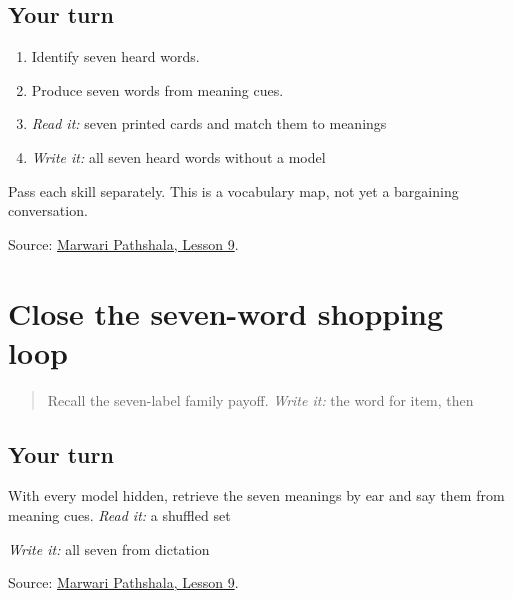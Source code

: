 \subsection*{Your turn}
\begin{enumerate}
\raggedright
  \item Identify seven heard words.
  \item Produce seven words from meaning cues.
  \item \emph{Read it:} seven printed cards and match them to meanings
  \item \emph{Write it:} all seven heard words without a model
\end{enumerate}

Pass each skill separately. This is a vocabulary map, not yet a bargaining conversation.

\begin{tcolorbox}[breakable,colback=teal!4,colframe=teal!35!black,title={Before you move on}]
Source: \href{https://www.marwaripathshala.com/marwari-lesson-9-english}{Marwari Pathshala, Lesson 9}.
\end{tcolorbox}
\section[Practice]{Close the seven-word shopping loop}

\label{lesson:MW-R15-shopping-close}



\begin{quote}
Recall the seven-label family payoff. \emph{Write it:} the word for item, then \textbf{}
\end{quote}

\subsection*{Your turn}
With every model hidden, retrieve the seven meanings by ear and say them from meaning cues. \emph{Read it:} a shuffled set

\emph{Write it:} all seven from dictation

\begin{tcolorbox}[breakable,colback=teal!4,colframe=teal!35!black,title={Before you move on}]
Source: \href{https://www.marwaripathshala.com/marwari-lesson-9-english}{Marwari Pathshala, Lesson 9}.
\end{tcolorbox}
